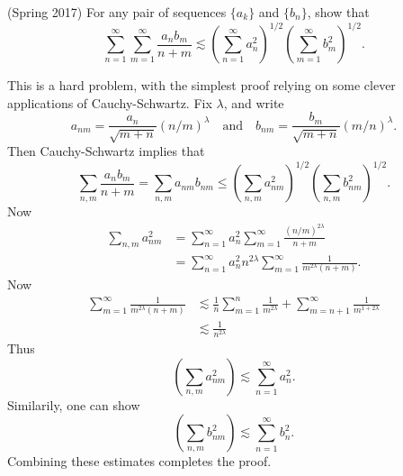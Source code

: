 \documentclass[answers]{exam}
\theoremstyle{problemstyle}
\newcommand{\1}[1]{\textbf{1}_{\left[#1\right]}} %
\begin{document}
\begin{questions}
\question (Spring 2017) For any pair of sequences $\{ a_k \}$ and $\{ b_n \}$, show that
%
\[ \sum_{n = 1}^\infty \sum_{m = 1}^\infty \frac{a_n b_m}{n + m} \lesssim \left( \sum_{n = 1}^\infty a_n^2 \right)^{1/2} \left( \sum_{m = 1}^\infty b_m^2 \right)^{1/2}. \]
\begin{solution}
	This is a hard problem, with the simplest proof relying on some clever applications of Cauchy-Schwartz. Fix $\lambda$, and write
	\[ a_{nm} = \frac{a_n}{\sqrt{m + n}} (n/m)^\lambda \quad\text{and}\quad b_{nm} = \frac{b_m}{\sqrt{m + n}} (m/n)^\lambda. \]
	Then Cauchy-Schwartz implies that
	\[ \sum_{n,m} \frac{a_n b_m}{n + m} = \sum_{n,m} a_{nm} b_{nm} \leq \left( \sum_{n,m} a_{nm}^2 \right)^{1/2} \left( \sum_{n,m} b_{nm}^2 \right)^{1/2}. \]
	Now
	\begin{align*}
		\sum_{n,m} a_{nm}^2 &= \sum_{n = 1}^\infty a_n^2 \sum_{m = 1}^\infty \frac{(n/m)^{2\lambda}}{n + m}\\
		&= \sum_{n = 1}^\infty a_n^2 n^{2\lambda} \sum_{m = 1}^\infty \frac{1}{m^{2\lambda} (n + m)}. 
	\end{align*}
	Now
	\begin{align*}
		\sum_{m = 1}^\infty \frac{1}{m^{2\lambda} (n + m)} &\lesssim \frac{1}{n} \sum_{m = 1}^n \frac{1}{m^{2\lambda}} + \sum_{m = n+1}^\infty \frac{1}{m^{1 + 2\lambda}}\\
		&\lesssim \frac{1}{n^{2\lambda}}
	\end{align*}
	Thus
	\[ \left( \sum_{n,m} a_{nm}^2 \right) \lesssim \sum_{n = 1}^\infty a_n^2. \]
	Similarily, one can show
	\[ \left( \sum_{n,m} b_{nm}^2 \right) \lesssim \sum_{n = 1}^\infty b_n^2. \]
	Combining these estimates completes the proof.


\end{solution}
\end{questions}
\end{document}
